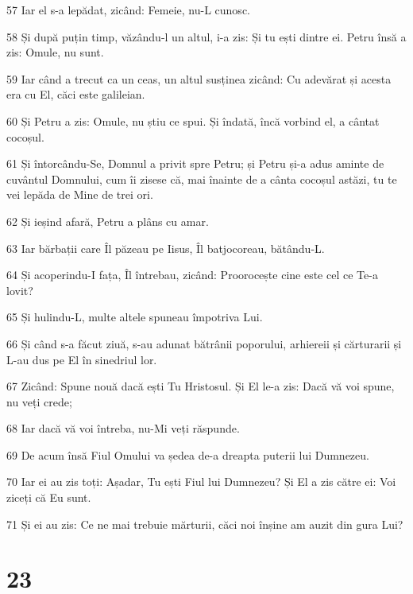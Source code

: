 \par 57 Iar el s-a lepădat, zicând: Femeie, nu-L cunosc.
\par 58 Și după puțin timp, văzându-l un altul, i-a zis: Și tu ești dintre ei. Petru însă a zis: Omule, nu sunt.
\par 59 Iar când a trecut ca un ceas, un altul susținea zicând: Cu adevărat și acesta era cu El, căci este galileian.
\par 60 Și Petru a zis: Omule, nu știu ce spui. Și îndată, încă vorbind el, a cântat cocoșul.
\par 61 Și întorcându-Se, Domnul a privit spre Petru; și Petru și-a adus aminte de cuvântul Domnului, cum îi zisese că, mai înainte de a cânta cocoșul astăzi, tu te vei lepăda de Mine de trei ori.
\par 62 Și ieșind afară, Petru a plâns cu amar.
\par 63 Iar bărbații care Îl păzeau pe Iisus, Îl batjocoreau, bătându-L.
\par 64 Și acoperindu-I fața, Îl întrebau, zicând: Proorocește cine este cel ce Te-a lovit?
\par 65 Și hulindu-L, multe altele spuneau împotriva Lui.
\par 66 Și când s-a făcut ziuă, s-au adunat bătrânii poporului, arhiereii și cărturarii și L-au dus pe El în sinedriul lor.
\par 67 Zicând: Spune nouă dacă ești Tu Hristosul. Și El le-a zis: Dacă vă voi spune, nu veți crede;
\par 68 Iar dacă vă voi întreba, nu-Mi veți răspunde.
\par 69 De acum însă Fiul Omului va ședea de-a dreapta puterii lui Dumnezeu.
\par 70 Iar ei au zis toți: Așadar, Tu ești Fiul lui Dumnezeu? Și El a zis către ei: Voi ziceți că Eu sunt.
\par 71 Și ei au zis: Ce ne mai trebuie mărturii, căci noi înșine am auzit din gura Lui?

\chapter{23}

